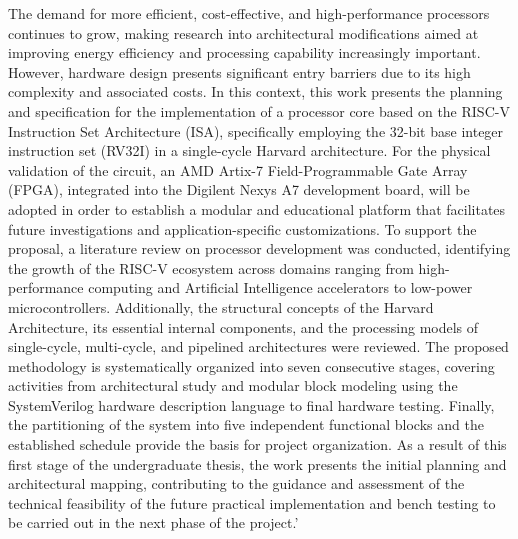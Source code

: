 
\begin{abstractutfpr}%

The demand for more efficient, cost-effective, and high-performance processors continues to grow, making research into architectural modifications aimed at improving energy efficiency and processing capability increasingly important. However, hardware design presents significant entry barriers due to its high complexity and associated costs. In this context, this work presents the planning and specification for the implementation of a processor core based on the RISC-V Instruction Set Architecture (ISA), specifically employing the 32-bit base integer instruction set (RV32I) in a single-cycle Harvard architecture. For the physical validation of the circuit, an AMD Artix-7 Field-Programmable Gate Array (FPGA), integrated into the Digilent Nexys A7 development board, will be adopted in order to establish a modular and educational platform that facilitates future investigations and application-specific customizations. To support the proposal, a literature review on processor development was conducted, identifying the growth of the RISC-V ecosystem across domains ranging from high-performance computing and Artificial Intelligence accelerators to low-power microcontrollers. Additionally, the structural concepts of the Harvard Architecture, its essential internal components, and the processing models of single-cycle, multi-cycle, and pipelined architectures were reviewed. The proposed methodology is systematically organized into seven consecutive stages, covering activities from architectural study and modular block modeling using the SystemVerilog hardware description language to final hardware testing. Finally, the partitioning of the system into five independent functional blocks and the established schedule provide the basis for project organization. As a result of this first stage of the undergraduate thesis, the work presents the initial planning and architectural mapping, contributing to the guidance and assessment of the technical feasibility of the future practical implementation and bench testing to be carried out in the next phase of the project.'

\end{abstractutfpr}
